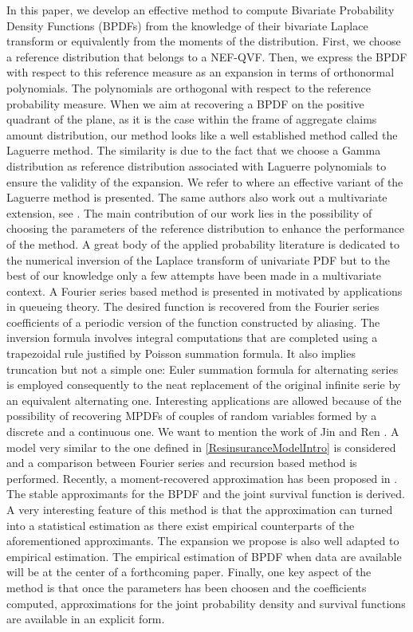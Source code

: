 In this paper, we develop an effective method to compute Bivariate Probability Density Functions (BPDFs) from the knowledge of their bivariate Laplace transform or equivalently from the moments of the distribution. First, we choose a reference distribution that belongs to a NEF-QVF. Then, we express the BPDF with respect to this reference measure as an expansion in terms of orthonormal polynomials. The polynomials are orthogonal with respect to the reference probability measure. When we aim at recovering a BPDF on the positive quadrant of the plane, as it is the case within the frame of aggregate claims amount distribution, our method looks like a well established method called the Laguerre method. The similarity is due to the fact that we choose a Gamma distribution as reference distribution associated with Laguerre polynomials to ensure the validity of the expansion. We refer to \citet{AbChWh95} where an effective variant of the Laguerre method is presented. The same authors also work out a multivariate extension, see \citet{AbChWh98}. The main contribution of our work lies in the possibility of choosing the parameters of the reference distribution to enhance the performance of the method. A great body of the applied probability literature is dedicated to the numerical inversion of the Laplace transform of univariate PDF but to the best of our knowledge only a few attempts have been made in a multivariate context. A Fourier series based method is presented in \citet{ChLuWh94} motivated by applications in queueing theory. The desired function is recovered from the Fourier series coefficients of a periodic version of the function constructed by aliasing. The inversion formula involves integral computations that are completed using a trapezoidal rule justified by Poisson summation formula. It also implies truncation but not a simple one: Euler summation formula for alternating series is employed consequently to the neat replacement of the original infinite serie by an equivalent alternating one. Interesting applications are allowed because of the possibility of recovering MPDFs of couples of random variables formed by a discrete and a continuous one. We want to mention the work of Jin and Ren \citet{JiRe13}. A model very similar to the one defined in \ref{ResinsuranceModelIntro} is considered and a comparison between Fourier series and recursion based method is performed. Recently, a moment-recovered approximation has been proposed in \citet{Mn11}. The stable approximants for the BPDF and the joint survival function is derived. A very interesting feature of this method is that the approximation can turned into a statistical estimation as there exist empirical counterparts of the aforementioned approximants. The expansion we propose is also well adapted to empirical estimation. The empirical estimation of BPDF when data are available will be at the center of a forthcoming paper. Finally, one key aspect of the method is that once the parameters has been choosen and the coefficients computed, approximations for the joint probability density and survival functions are available in an explicit form.\\
